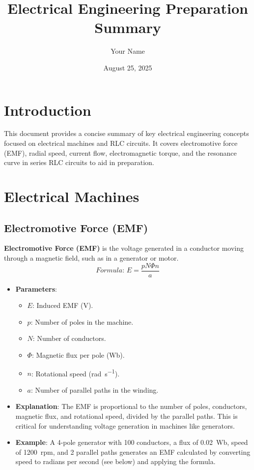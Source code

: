 \documentclass[12pt]{article}
\newcommand{\concept}[1]{\textbf{#1}}
\newcommand{\formula}[1]{\textit{Formula: }#1}
\begin{document}
\title{Electrical Engineering Preparation Summary}
\author{Your Name}
\date{August 25, 2025}
\maketitle

\tableofcontents
\newpage

\section{Introduction}
This document provides a concise summary of key electrical engineering concepts focused on electrical machines and RLC circuits. It covers electromotive force (EMF), radial speed, current flow, electromagnetic torque, and the resonance curve in series RLC circuits to aid in preparation.

\section{Electrical Machines}
\subsection{Electromotive Force (EMF)}
\concept{Electromotive Force (EMF)} is the voltage generated in a conductor moving through a magnetic field, such as in a generator or motor.
\[
\formula{E = \frac{p N \Phi n}{a}}
\]
\begin{itemize}
    \item \textbf{Parameters}:
        \begin{itemize}
            \item \(E\): Induced EMF (\si{\volt}).
            \item \(p\): Number of poles in the machine.
            \item \(N\): Number of conductors.
            \item \(\Phi\): Magnetic flux per pole (\si{\weber}).
            \item \(n\): Rotational speed (\si{\radian\per\second}).
            \item \(a\): Number of parallel paths in the winding.
        \end{itemize}
    \item \textbf{Explanation}: The EMF is proportional to the number of poles, conductors, magnetic flux, and rotational speed, divided by the parallel paths. This is critical for understanding voltage generation in machines like generators.
    \item \textbf{Example}: A 4-pole generator with 100 conductors, a flux of \SI{0.02}{\weber}, speed of \SI{1200}{rpm}, and 2 parallel paths generates an EMF calculated by converting speed to radians per second (see below) and applying the formula.
\end{itemize}
\end{document}
